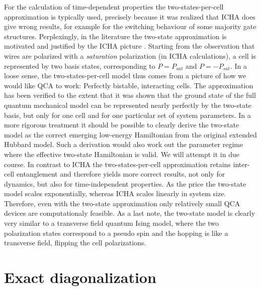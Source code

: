 For the calculation of time-dependent properties the two-states-per-cell
approximation is typically used, precisely because it was realized that ICHA
does give wrong results, for example for the switching behaviour of some
majority gate structures. Perplexingly, in the literature the two-state
approximation is motivated and justified by the ICHA picture
\cite{tougaw1996dynamic}. Starting from the observation that wires are polarized
with a \emph{saturation} polarization (in ICHA calculations), a cell is
represented by two basis states, corresponding to $P = P_{sat}$ and $P = -
P_{sat}$. In a loose sense, the two-states-per-cell model thus comes from a
picture of how we would like QCA to work: Perfectly bistable, interacting cells.
The approximation has been verified to the extent that it was shown that the
ground state of the full quantum mechanical model can be represented nearly
perfectly by the two-state basis, but only for one cell and for one particular
set of system parameters. In a more rigorous treatment it should be possible to
clearly derive the two-state model as the correct emerging low-energy
Hamiltonian from the original extended Hubbard model. Such a derivation would
also work out the parameter regime where the effective two-state Hamiltonian is
valid. We will attempt it in due course. In contrast to ICHA the
two-states-per-cell approximation retains inter-cell entanglement and therefore
yields more correct results, not only for dynamics, but also for
time-independent properties. As the price the two-state model scales
exponentially, whereas ICHA scales linearly in system size.  Therefore, even
with the two-state approximation only relatively small QCA devices are
computationaly feasible. As a last note, the two-state model is clearly very
similar to a transverse field quantum Ising model, where the two polarization
states correspond to a pseudo spin and the hopping is like a transverse field,
flipping the cell polarizations.


\section{Exact diagonalization}

